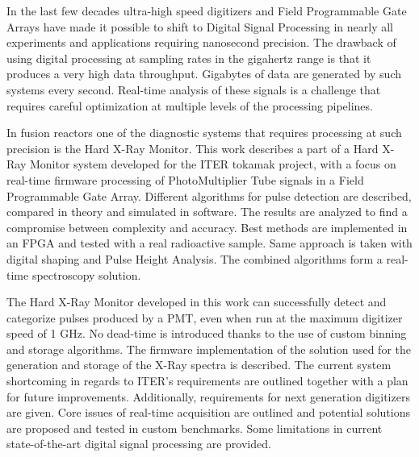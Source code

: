 In the last few decades ultra-high speed digitizers and 
Field Programmable Gate Arrays have made it possible to shift
to Digital Signal Processing in nearly all experiments and applications
requiring nanosecond precision. 
The drawback of using digital processing at sampling rates in the gigahertz range
is that it produces a very high data throughput. Gigabytes of data
are generated by such systems every second. Real-time analysis 
of these signals is a challenge that requires careful optimization
at multiple levels of the processing pipelines.


In fusion reactors one of the diagnostic systems that requires processing
at such precision is the Hard X-Ray Monitor. 
This work describes a part of a Hard X-Ray Monitor system developed for 
the ITER tokamak project, with a focus on real-time firmware processing
of PhotoMultiplier Tube signals in a Field Programmable Gate Array.
Different algorithms for pulse detection are described, compared 
in theory and simulated in software.
The results are analyzed to find a compromise between complexity and accuracy.
Best methods are implemented in an FPGA and tested with a real radioactive sample.
Same approach is taken with digital shaping and Pulse Height Analysis.
The combined algorithms form a real-time spectroscopy solution.


The Hard X-Ray Monitor developed in this work can successfully 
detect and categorize pulses produced by a PMT, even when 
run at the maximum digitizer speed of 1 GHz. No dead-time is 
introduced thanks to the use of custom binning and storage algorithms.
The firmware implementation of the solution used for the generation and storage of
the X-Ray spectra is described. The current system shortcoming in regards to ITER's 
requirements are outlined together with a plan for future improvements.
Additionally, requirements for next generation digitizers are given.
Core issues of real-time acquisition are outlined and potential solutions
are proposed and tested in custom benchmarks. Some limitations in
current state-of-the-art digital signal processing are provided.


